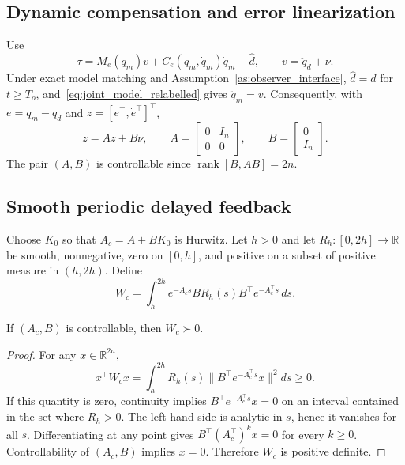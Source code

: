 \subsection{Dynamic compensation and error linearization}
Use
\begin{equation}
 \tau=M_e(q_m)v+C_e(q_m,\dot q_m)\dot q_m-\hat d,
 \qquad v=\ddot q_d+\nu.
 \label{eq:computed_torque}
\end{equation}
Under exact model matching and Assumption~\ref{as:observer_interface},
$\hat d=d$ for $t\geq T_o$, and~\eqref{eq:joint_model_relabelled} gives
$\ddot q_m=v$. Consequently, with
$e=q_m-q_d$ and $z=[e^\top,\dot e^\top]^\top$,
\begin{equation}
 \dot z=Az+B\nu,
 \qquad A=\begin{bmatrix}0&I_n\\0&0\end{bmatrix},
 \qquad B=\begin{bmatrix}0\\I_n\end{bmatrix}.
 \label{eq:linear_error}
\end{equation}
The pair $(A,B)$ is controllable since
$\operatorname{rank}[B,AB]=2n$.

\subsection{Smooth periodic delayed feedback}\label{sec:pdf_design}
Choose $K_0$ so that $A_c=A+BK_0$ is Hurwitz. Let $h>0$ and let
$R_h:[0,2h]\to\mathbb R$ be smooth, nonnegative, zero on $[0,h]$, and
positive on a subset of positive measure in $(h,2h)$. Define
\begin{equation}
 W_c=\int_h^{2h}e^{-A_cs}B R_h(s)B^\top e^{-A_c^\top s}\,ds.
 \label{eq:wc_matrix}
\end{equation}
\begin{lemma}\label{lem:gramian}
If $(A_c,B)$ is controllable, then $W_c\succ0$.
\end{lemma}
\begin{proof}
For any $x\in\mathbb R^{2n}$,
\[
 x^\top W_cx=\int_h^{2h}R_h(s)\|B^\top e^{-A_c^\top s}x\|^2ds\geq0.
\]
If this quantity is zero, continuity implies
$B^\top e^{-A_c^\top s}x=0$ on an interval contained in the set where
$R_h>0$. The left-hand side is analytic in $s$, hence it vanishes for all
$s$. Differentiating at any point gives
$B^\top(A_c^\top)^kx=0$ for every $k\geq0$. Controllability of
$(A_c,B)$ implies $x=0$. Therefore $W_c$ is positive definite.
\end{proof}

